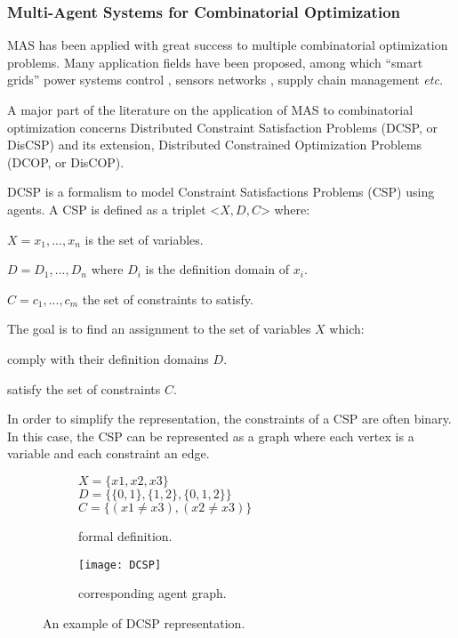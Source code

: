 \subsubsection{Multi-Agent Systems for Combinatorial Optimization}

MAS has been applied with great success to multiple combinatorial optimization problems. Many application fields have been proposed, among which \enquote{smart grids} power systems control \cite{RocheLauriBlunierMiraouiKoukam2013_561}, sensors networks \cite{Vinyals3589}, supply chain management \cite{Marik2011, Ka2011.6} \emph{etc.}

A major part of the literature on the application of MAS to combinatorial optimization concerns Distributed Constraint Satisfaction Problems (DCSP, or DisCSP) and its extension, Distributed Constrained Optimization Problems (DCOP, or DisCOP).

DCSP \cite{yokoo1998distributed} is a formalism to model Constraint Satisfactions Problems (CSP) using agents. A CSP is defined as a triplet <$X,D,C$> where:
\begin{compactitem}
\item $X = {x_1, ..., x_n}$ is the set of variables.
\item $D = {D_1, ..., D_n}$ where $D_i$ is the definition domain of $x_i$.
\item $C ={c_1, ..., c_m}$ the set of constraints to satisfy.
\end{compactitem}

The goal is to find an assignment to the set of variables $X$ which:
\begin{compactitem}
\item comply with their definition domains $D$.
\item satisfy the set of constraints $C$.
\end{compactitem}

In order to simplify the representation, the constraints of a CSP are often binary. In this case, the CSP can be represented as a graph where each vertex is a variable and each constraint an edge.

\begin{figure}[]
\centering
	\begin{subfigure}[b]{0.35\textwidth}
			$X = \{x1, x2, x3\}$\\
			$D = \{\{0,1\}, \{1,2\}, \{0,1,2\}\}$\\
			$C = \{(x1 \neq x3), (x2 \neq x3)\}$		
		\caption{formal definition.}
	\end{subfigure}
	\begin{subfigure}[b]{0.45\textwidth}
			\centering
			\texttt{[image: DCSP]}
			\caption{corresponding agent graph.}\label{dcsp:graph}
	\end{subfigure}

\caption{An example of DCSP representation.}
\label{dcsp}

\end{figure}

